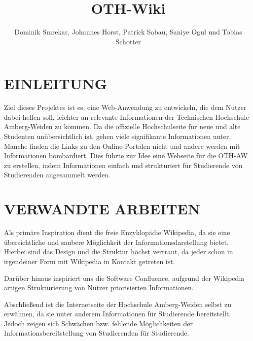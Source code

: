 \documentclass[letterpaper, 10 pt, conference]{ieeeconf}  %
\title{\LARGE \bf
OTH-Wiki
}
\author{Dominik Smrekar, Johannes Horst, Patrick Sabau, Saniye Ogul und Tobias Schotter}%
\begin{document}
\maketitle
\thispagestyle{empty}
\pagestyle{empty}

\section{EINLEITUNG}

Ziel dieses Projektes ist es, eine Web-Anwendung zu entwickeln, die dem Nutzer dabei helfen soll, leichter an relevante Informationen der Technischen Hochschule Amberg-Weiden zu kommen. Da die offizielle Hochschulseite für neue und alte Studenten unübersichtlich ist, gehen viele signifikante Informationen unter. Manche finden die Links zu den Online-Portalen nicht und andere werden mit Informationen bombardiert. Dies führte zur Idee eine Webseite für die OTH-AW zu erstellen, indem Informationen einfach und strukturiert für Studierende von Studierenden angesammelt werden.



\section{VERWANDTE ARBEITEN}

Als primäre Inspiration dient die freie Enzyklopädie Wikipedia, da sie eine übersichtliche und saubere Möglichkeit der Informationsdarstellung bietet. Hierbei sind das Design und die Struktur höchst vertraut, da jeder schon in irgendeiner Form mit Wikipedia in Kontakt getreten ist.

Darüber hinaus inspiriert uns die Software Confluence, aufgrund der Wikipedia artigen Strukturierung von Nutzer priorisierten Informationen.

Abschließend ist die Internetseite der Hochschule Amberg-Weiden selbst zu erwähnen, da sie unter anderem Informationen für Studierende bereitstellt. Jedoch zeigen sich Schwächen bzw. fehlende Möglichkeiten der Informationsbereitstellung von Studierenden für Studierende.
\end{document}
